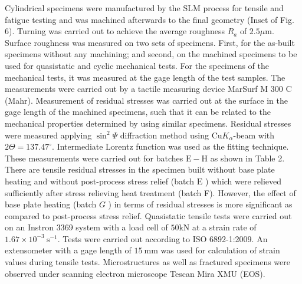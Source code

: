 \documentclass[10pt]{article}
\begin{document}
Cylindrical specimens were manufactured by the SLM process for tensile and fatigue testing and was machined afterwards to the final geometry (Inset of Fig. 6). Turning was carried out to achieve the average roughness $R_{a}$ of $2.5 \mu \mathrm{m}$. Surface roughness was measured on two sets of specimens. First, for the as-built specimens without any machining; and second, on the machined specimens to be used for quasistatic and cyclic mechanical tests. For the specimens of the mechanical tests, it was measured at the gage length of the test samples. The measurements were carried out by a tactile measuring device MarSurf M 300 C (Mahr). Measurement of residual stresses was carried out at the surface in the gage length of the machined specimens, such that it can be related to the mechanical properties determined by using similar specimens. Residual stresses were measured applying $\sin ^{2} \Psi$ diffraction method using $\mathrm{Cu} K_{\alpha}$-beam with $2 \Theta=137.47^{\circ}$. Intermediate Lorentz function was used as the fitting technique. These measurements were carried out for batches $\mathrm{E}-\mathrm{H}$ as shown in Table 2. There are tensile residual stresses in the specimen built without base plate heating and without post-process stress relief (batch $\mathrm{E}$ ) which were relieved sufficiently after stress relieving heat treatment (batch F). However, the effect of base plate heating (batch $G$ ) in terms of residual stresses is more significant as compared to post-process stress relief. Quasistatic tensile tests were carried out on an Instron 3369 system with a load cell of $50 \mathrm{kN}$ at a strain rate of $1.67 \times 10^{-3} \mathrm{~s}^{-1}$. Tests were carried out according to ISO 6892-1:2009. An extensometer with a gage length of $15 \mathrm{~mm}$ was used for calculation of strain values during tensile tests. Microstructures as well as fractured specimens were observed under scanning electron microscope Tescan Mira XMU (EOS).
\end{document}
